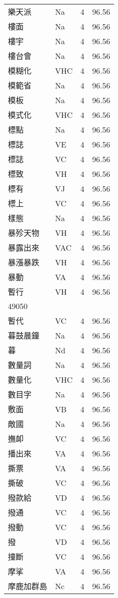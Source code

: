\documentclass[twocolumn]{book}
\begin{document}
\begin{supertabular}{llrr}
樂天派 & Na & 4 &  96.56\\
樓面 & Na & 4 &  96.56\\
樓宇 & Na & 4 &  96.56\\
樓台會 & Na & 4 &  96.56\\
模糊化 & VHC & 4 &  96.56\\
模範省 & Na & 4 &  96.56\\
模板 & Na & 4 &  96.56\\
模式化 & VHC & 4 &  96.56\\
標點 & Na & 4 &  96.56\\
標誌 & VE & 4 &  96.56\\
標誌 & VC & 4 &  96.56\\
標致 & VH & 4 &  96.56\\
標有 & VJ & 4 &  96.56\\
標上 & VC & 4 &  96.56\\
樣態 & Na & 4 &  96.56\\
暴殄天物 & VH & 4 &  96.56\\
暴露出來 & VAC & 4 &  96.56\\
暴漲暴跌 & VH & 4 &  96.56\\
暴動 & VA & 4 &  96.56\\
暫行 & VH & 4 &  96.56\\
49050\\
暫代 & VC & 4 &  96.56\\
暮鼓晨鐘 & Na & 4 &  96.56\\
暮 & Nd & 4 &  96.56\\
數量詞 & Na & 4 &  96.56\\
數量化 & VHC & 4 &  96.56\\
數目字 & Na & 4 &  96.56\\
敷面 & VB & 4 &  96.56\\
敵國 & Na & 4 &  96.56\\
撫卹 & VC & 4 &  96.56\\
播出來 & VA & 4 &  96.56\\
撕票 & VA & 4 &  96.56\\
撕破 & VC & 4 &  96.56\\
撥款給 & VD & 4 &  96.56\\
撥通 & VC & 4 &  96.56\\
撥動 & VC & 4 &  96.56\\
撥 & VD & 4 &  96.56\\
撞斷 & VC & 4 &  96.56\\
摩挲 & VA & 4 &  96.56\\
摩鹿加群島 & Nc & 4 &  96.56\\

\end{supertabular}
\end{document}
